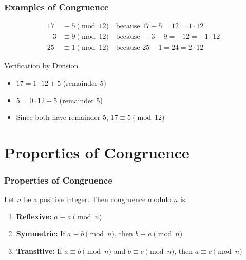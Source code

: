 \documentclass[10pt]{beamer}
\begin{document}
\begin{frame}
    \frametitle{Examples of Congruence}
    \begin{example}
        \begin{align}
            17 & \equiv 5 \pmod{12} \quad \text{because } 17 - 5 = 12 = 1 \cdot 12   \\
            -3 & \equiv 9 \pmod{12} \quad \text{because } -3 - 9 = -12 = -1 \cdot 12 \\
            25 & \equiv 1 \pmod{12} \quad \text{because } 25 - 1 = 24 = 2 \cdot 12
        \end{align}
    \end{example}

    \vspace{0.5cm}

    \begin{block}{Verification by Division}
        \begin{itemize}
            \item $17 = 1 \cdot 12 + 5$ (remainder 5)
            \item $5 = 0 \cdot 12 + 5$ (remainder 5)
            \item Since both have remainder 5, $17 \equiv 5 \pmod{12}$
        \end{itemize}
    \end{block}
\end{frame}

\section{Properties of Congruence}

\begin{frame}
    \frametitle{Properties of Congruence}
    \begin{theorem}
        Let $n$ be a positive integer. Then congruence modulo $n$ is:
        \begin{enumerate}
            \item \textbf{Reflexive:} $a \equiv a \pmod{n}$
            \item \textbf{Symmetric:} If $a \equiv b \pmod{n}$, then $b \equiv a \pmod{n}$
            \item \textbf{Transitive:} If $a \equiv b \pmod{n}$ and $b \equiv c \pmod{n}$, then $a \equiv c \pmod{n}$
        \end{enumerate}
    \end{theorem}

\end{frame}
\end{document}
